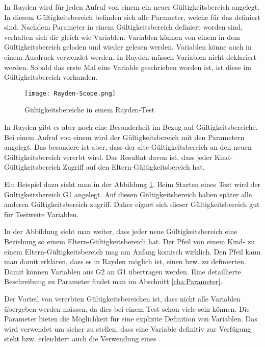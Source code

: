 In Rayden wird für jeden Aufruf von einem  ein neuer Gültigkeitsbereich angelegt. In diesem Gültigkeitsbereich befinden sich alle Parameter, welche für das  definiert sind. Nachdem Parameter in einem Gültigkeitsbereich definiert worden sind, verhalten sich die gleich wie Variablen. Variablen können von einem  in dem Gültigkeitsbereich geladen und wieder gelesen werden. Variablen könne auch in einem Ausdruck verwendet werden. In Rayden müssen Variablen nicht deklariert werden. Sobald das erste Mal eine Variable geschrieben worden ist, ist diese im Gültigkeitsbereich vorhanden.

\begin{figure}[h]
\centering
\texttt{[image: Rayden-Scope.png]}
\caption{Gültigkeitsbereiche in einem Rayden-Test}
\label{fig:rayden-scope}
\end{figure}

\SuperPar
In Rayden gibt es aber noch eine Besonderheit im Bezug auf Gültigkeitsbereiche. Bei einem Aufruf von einem  wird der Gültigkeitsbereich mit den Parametern angelegt. Das besondere ist aber, dass der alte Gültigkeitsbereich an den neuen Gültigkeitsbereich vererbt wird. Das Resultat davon ist, dass jeder Kind-Gültigkeitsbereich Zugriff auf den Eltern-Gültigkeitsbereich hat.

\SuperPar
Ein Beispiel dazu sieht man in der Abbildung \ref{fig:rayden-scope}. Beim Starten eines Test wird der Gültigkeitsbereich G1 angelegt. Auf diesen Gültigkeitsbereich haben später alle anderen Gültigkeitsbereich zugriff. Daher eignet sich dieser Gültigkeitsbereich gut für Testweite Variablen.

\SuperPar
In der Abbildung sieht man weiter, dass jeder neue Gültigkeitsbereich eine Beziehung so einem Eltern-Gültigkeitsbereich hat. Der Pfeil von einem Kind- zu einem Eltern-Gültigkeitsbereich mag am Anfang komisch wirklich. Den Pfeil kann man damit erklären, dass es in Rayden möglich ist, einen  bzw.  zu definierten. Damit können Variablen aus G2 an G1 übertragen werden. Eine detaillierte Beschreibung zu Parameter findet man im Abschnitt \ref{cha:Parameter}.

\SuperPar
Der Vorteil von vererbten Gültigkeitsbereichen ist, dass nicht alle Variablen übergeben werden müssen, da dies bei einem Test schon viele sein können. Die Parameter bieten die Möglichkeit für eine explizite Definition von Variablen. Das wird verwendet um sicher zu stellen, dass eine Variable definitiv zur Verfügung steht bzw. erleichtert auch die Verwendung eines .

